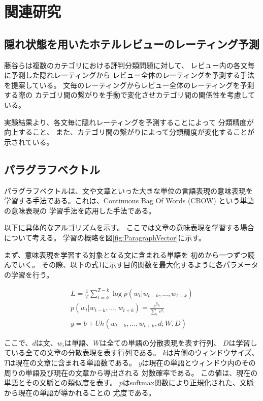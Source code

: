 \documentclass[twocolumn,a4paper]{ltjarticle}
\begin{document}
\section{関連研究}

\subsection{隠れ状態を用いたホテルレビューのレーティング予測}

藤谷ら\cite{fujitani15}は複数のカテゴリにおける評判分類問題に対して、
レビュー内の各文毎に予測した隠れレーティングから
レビュー全体のレーティングを予測する手法を提案している。
文毎のレーティングからレビュー全体のレーティングを予測する際の
カテゴリ間の繋がりを手動で変化させカテゴリ間の関係性を考慮している。

実験結果より、各文毎に隠れレーティングを予測することによって
分類精度が向上すること、
また、カテゴリ間の繋がりによって分類精度が変化することが示されている。


\subsection{パラグラフベクトル}

パラグラフベクトルは、文や文章といった大きな単位の言語表現の意味表現を
学習する手法である。これは、Continuous Bag Of Words (CBOW)
という単語の意味表現の 学習手法を応用した手法である。

以下に具体的なアルゴリズムを示す。
ここでは文章の意味表現を学習する場合について考える。
学習の概略を図\ref{fig:ParagraphVector}に示す。

まず、意味表現を学習する対象となる文に含まれる単語を
初めから一つずつ読んでいく。
その際、以下の式1に示す目的関数を最大化するように各パラメータの学習を行う。

\begin{gather}
  L = \frac{1}{T} \sum^{T - k}_{t = k} \log p(w_t | w_{t-k}, ..., w_{t+k}) \\
  p(w_t | w_{t-k}, ..., w_{t+k}) = \frac{e^{y_{w_t}}}{\sum_i e^{y_i}} \\
  y = b + Uh(w_{t-k}, ..., w_{t+k}, d; W, D)
\end{gather}

ここで、$d$は文、$w_i$は単語、$W$は全ての単語の分散表現を表す行列、
$D$は学習している全ての文章の分散表現を表す行列である。
$k$は片側のウィンドウサイズ、
$T$は現在の文章に含まれる単語数である。
$y$は現在の単語とウィンドウ内のその周りの単語及び現在の文章から導出される
対数確率である。 この値は、現在の単語とその文脈との類似度を表す。
$p$はsoftmax関数により正規化された、文脈から現在の単語が導かれることの
尤度である。
\end{document}
